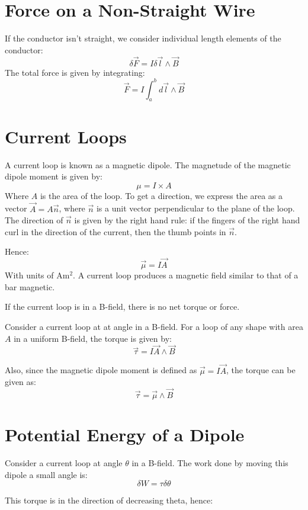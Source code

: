 \section{Force on a Non-Straight Wire}
If the conductor isn't straight, we consider individual length elements of the conductor:
\[
    \delta \vec{F} = I \delta \vec{l} \wedge \vec{B}
\]
The total force is given by integrating:
\[
    \vec{F} = I \int_a^b d \vec{l} \wedge \vec{B}
\]

\section{Current Loops}
A current loop is known as a magnetic dipole. The magnetude of the magnetic dipole moment is given by:
\[
    \mu = I \times A
\]
Where $A$ is the area of the loop. To get a direction, we express the area as a vector $\vec{A} = A \vec{n}$, where $\vec{n}$ is a unit vector perpendicular to the plane of the loop. The direction of $\vec{n}$ is given by the right hand rule: if the fingers of the right hand curl in the direction of the current, then the thumb points in $\vec{n}$.

Hence:
\[
    \vec{\mu} = I \vec{A}
\]
With units of $\si{\ampere \metre^2}$. A current loop produces a magnetic field similar to that of a bar magnetic. 

If the current loop is in a B-field, there is no net torque or force. 

Consider a current loop at at angle in a B-field. For a loop of any shape with area $A$ in a uniform B-field, the torque is given by:
\[
    \vec{\tau} = I \vec{A} \wedge \vec{B}
\] 

Also, since the magnetic dipole moment is defined as $\vec{\mu} = I \vec{A}$, the torque can be given as:
\[
  \vec{\tau} = \vec{\mu} \wedge \vec{B}
\]

\section{Potential Energy of a Dipole}
Consider a current loop at angle $\theta$ in a B-field. The work done by moving this dipole a small angle is:
\[
    \delta W = \tau \delta \theta
\]

This torque is in the direction of decreasing theta, hence:



